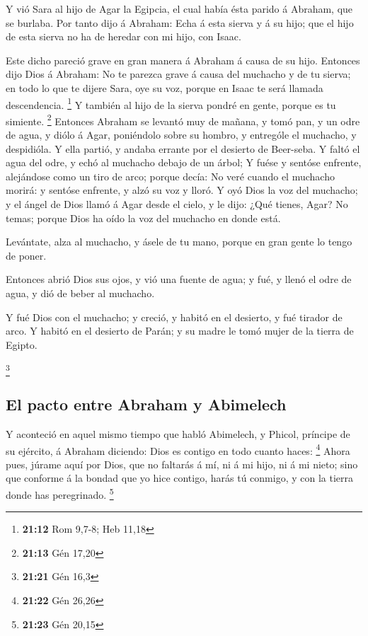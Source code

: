  Y vió Sara al hijo de Agar la Egipcia, el cual había ésta
parido á Abraham, que se burlaba.  Por tanto dijo á
Abraham: Echa á esta sierva y á su hijo; que el hijo de esta sierva no
ha de heredar con mi hijo, con Isaac.

 Este dicho pareció grave en gran manera á Abraham á
causa de su hijo.  Entonces dijo Dios á Abraham: No te
parezca grave á causa del muchacho y de tu sierva; en todo lo que te
dijere Sara, oye su voz, porque en Isaac te será llamada descendencia.
\footnote{\textbf{21:12} Rom 9,7-8; Heb 11,18}  Y también
al hijo de la sierva pondré en gente, porque es tu simiente. \footnote{\textbf{21:13}
  Gén 17,20}  Entonces Abraham se levantó muy de mañana,
y tomó pan, y un odre de agua, y diólo á Agar, poniéndolo sobre su
hombro, y entrególe el muchacho, y despidióla. Y ella partió, y andaba
errante por el desierto de Beer-seba.  Y faltó el agua
del odre, y echó al muchacho debajo de un árbol;  Y fuése
y sentóse enfrente, alejándose como un tiro de arco; porque decía: No
veré cuando el muchacho morirá: y sentóse enfrente, y alzó su voz y
lloró.  Y oyó Dios la voz del muchacho; y el ángel de
Dios llamó á Agar desde el cielo, y le dijo: ¿Qué tienes, Agar? No
temas; porque Dios ha oído la voz del muchacho en donde está.

 Levántate, alza al muchacho, y ásele de tu mano, porque
en gran gente lo tengo de poner.

 Entonces abrió Dios sus ojos, y vió una fuente de agua;
y fué, y llenó el odre de agua, y dió de beber al muchacho.

 Y fué Dios con el muchacho; y creció, y habitó en el
desierto, y fué tirador de arco.  Y habitó en el desierto
de Parán; y su madre le tomó mujer de la tierra de Egipto.

\footnote{\textbf{21:21} Gén 16,3}

\hypertarget{el-pacto-entre-abraham-y-abimelech}{%
\subsection{El pacto entre Abraham y
Abimelech}\label{el-pacto-entre-abraham-y-abimelech}}

 Y aconteció en aquel mismo tiempo que habló Abimelech, y
Phicol, príncipe de su ejército, á Abraham diciendo: Dios es contigo en
todo cuanto haces: \footnote{\textbf{21:22} Gén 26,26} 
Ahora pues, júrame aquí por Dios, que no faltarás á mí, ni á mi hijo, ni
á mi nieto; sino que conforme á la bondad que yo hice contigo, harás tú
conmigo, y con la tierra donde has peregrinado. \footnote{\textbf{21:23}
  Gén 20,15}

